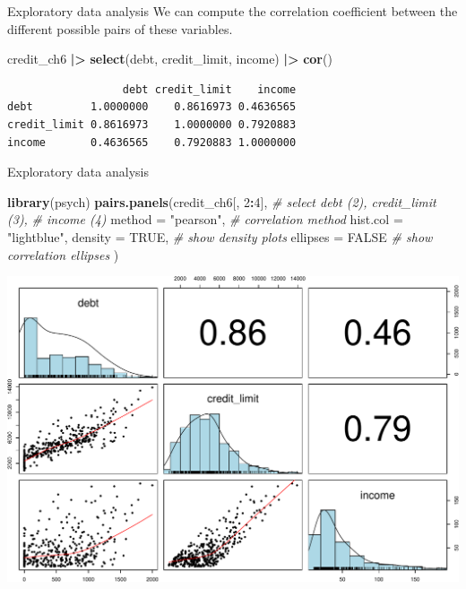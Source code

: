 \documentclass[
  ignorenonframetext,
]{beamer}
\newenvironment{Shaded}{\begin{snugshade}}{\end{snugshade}}
\newcommand{\AttributeTok}[1]{\textcolor[rgb]{0.13,0.29,0.53}{#1}}
\newcommand{\CommentTok}[1]{\textcolor[rgb]{0.56,0.35,0.01}{\textit{#1}}}
\newcommand{\ConstantTok}[1]{\textcolor[rgb]{0.56,0.35,0.01}{#1}}
\newcommand{\DecValTok}[1]{\textcolor[rgb]{0.00,0.00,0.81}{#1}}
\newcommand{\FunctionTok}[1]{\textcolor[rgb]{0.13,0.29,0.53}{\textbf{#1}}}
\newcommand{\NormalTok}[1]{#1}
\newcommand{\SpecialCharTok}[1]{\textcolor[rgb]{0.81,0.36,0.00}{\textbf{#1}}}
\newcommand{\StringTok}[1]{\textcolor[rgb]{0.31,0.60,0.02}{#1}}
\begin{document}
\begin{frame}[fragile]{Exploratory data analysis}
\protect\hypertarget{exploratory-data-analysis-17}{}
We can compute the correlation coefficient between the different
possible pairs of these variables.

\normalsize

\begin{Shaded}
\begin{Highlighting}[]
\NormalTok{credit\_ch6 }\SpecialCharTok{|\textgreater{}} 
  \FunctionTok{select}\NormalTok{(debt, credit\_limit, income) }\SpecialCharTok{|\textgreater{}} 
  \FunctionTok{cor}\NormalTok{()}
\end{Highlighting}
\end{Shaded}

\begin{verbatim}
                  debt credit_limit    income
debt         1.0000000    0.8616973 0.4636565
credit_limit 0.8616973    1.0000000 0.7920883
income       0.4636565    0.7920883 1.0000000
\end{verbatim}

\normalsize
\end{frame}

\begin{frame}[fragile]{Exploratory data analysis}
\protect\hypertarget{exploratory-data-analysis-18}{}
\small

\begin{Shaded}
\begin{Highlighting}[]
\FunctionTok{library}\NormalTok{(psych)}
\FunctionTok{pairs.panels}\NormalTok{(credit\_ch6[, }\DecValTok{2}\SpecialCharTok{:}\DecValTok{4}\NormalTok{],  }\CommentTok{\# select debt (2), credit\_limit (3), }
             \CommentTok{\# income (4)}
             \AttributeTok{method =} \StringTok{"pearson"}\NormalTok{, }\CommentTok{\# correlation method}
             \AttributeTok{hist.col =} \StringTok{"lightblue"}\NormalTok{,}
             \AttributeTok{density =} \ConstantTok{TRUE}\NormalTok{,  }\CommentTok{\# show density plots}
             \AttributeTok{ellipses =} \ConstantTok{FALSE} \CommentTok{\# show correlation ellipses}
\NormalTok{             )}
\end{Highlighting}
\end{Shaded}

\begin{center}\includegraphics[width=0.6\linewidth,height=0.45\textheight]{Week5_Lect_files/figure-beamer/unnamed-chunk-41-1} \end{center}
\normalsize
\end{frame}
\end{document}

